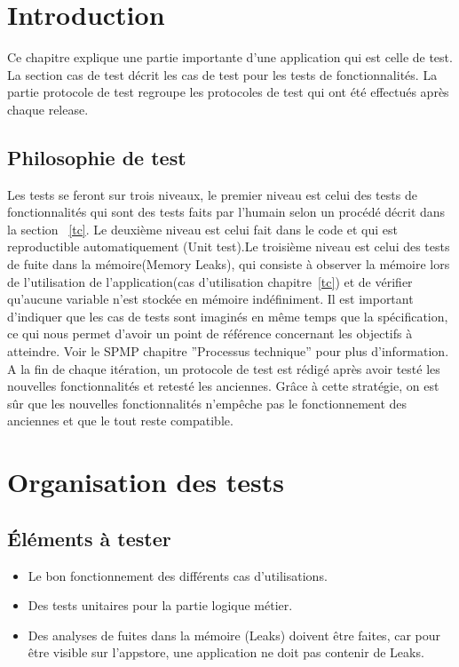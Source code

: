 \section{Introduction}
	Ce chapitre explique une partie importante d'une application qui est celle de test. La section cas de test décrit les cas de test pour les tests de fonctionnalités. La partie protocole de test regroupe les protocoles de test qui ont été effectués après chaque release. 
	\subsection{Philosophie de test}
	Les tests se feront sur trois niveaux, le premier niveau est celui des tests de fonctionnalités qui sont des tests faits par l'humain selon un procédé décrit dans la section ~\ref{tc}.  Le deuxième niveau est celui fait dans le code et qui est reproductible automatiquement (Unit test).Le troisième niveau est celui des tests de fuite dans la mémoire(Memory Leaks), qui consiste à observer la mémoire lors de l'utilisation de l'application(cas d'utilisation chapitre~\ref{tc}) et de vérifier qu'aucune variable n'est stockée en mémoire indéfiniment. Il est important d'indiquer que les cas de tests sont imaginés en même temps que la spécification, ce qui nous permet d'avoir un point de référence concernant les objectifs à atteindre. Voir le \gls{SPMP} chapitre ''Processus technique'' pour plus d'information.\\
	 A la fin de chaque itération, un protocole de test est rédigé après avoir testé les nouvelles fonctionnalités et retesté les anciennes. Grâce à cette stratégie, on est sûr que les nouvelles fonctionnalités n'empêche pas le fonctionnement des anciennes et que le tout reste compatible.
\section{Organisation des tests }
	\subsection{Éléments à tester}
		\begin{itemize}
			\item Le bon fonctionnement des différents cas d'utilisations.
			\item Des tests unitaires pour la partie logique métier.
			\item Des analyses de fuites dans la mémoire (Leaks) doivent être faites, car pour être visible sur l'appstore, une application ne doit pas contenir de Leaks.
		\end{itemize}
